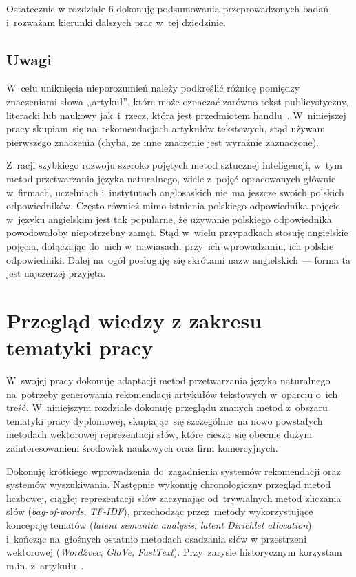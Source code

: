 \documentclass[pl]{minipw} %
\begin{document}
Ostatecznie w rozdziale 6 dokonuję podsumowania przeprowadzonych badań i~rozważam kierunki dalszych prac w~tej dziedzinie.

\section{Uwagi}
W~celu uniknięcia nieporozumień należy podkreślić różnicę pomiędzy znaczeniami słowa ,,artykuł'', które może oznaczać zarówno tekst publicystyczny, literacki lub naukowy jak~i~rzecz, która jest przedmiotem handlu~\cite{slownik}. W~niniejszej pracy skupiam~się na~rekomendacjach artykułów tekstowych, stąd używam pierwszego znaczenia (chyba, że inne znaczenie jest wyraźnie zaznaczone).

Z~racji szybkiego rozwoju szeroko pojętych metod sztucznej inteligencji, w~tym metod przetwarzania języka naturalnego, wiele z~pojęć opracowanych głównie w~firmach, uczelniach i~instytutach anglosaskich nie~ma jeszcze swoich polskich odpowiedników. Często również mimo istnienia polskiego odpowiednika pojęcie w~języku angielskim jest tak popularne, że używanie polskiego odpowiednika powodowałoby niepotrzebny zamęt. Stąd w~wielu przypadkach stosuję angielskie pojęcia, dołączając do~nich w~nawiasach, przy~ich wprowadzaniu, ich polskie odpowiedniki. Dalej na~ogół posługuję~się skrótami nazw angielskich --- forma ta jest najszerzej przyjęta. 

\chapter{Przegląd wiedzy z zakresu tematyki pracy}
W~swojej pracy dokonuję adaptacji metod przetwarzania języka naturalnego na~potrzeby generowania rekomendacji artykułów tekstowych w~oparciu o~ich treść. W~niniejszym rozdziale dokonuję przeglądu znanych metod z~obszaru tematyki pracy dyplomowej, skupiając~się szczególnie~na nowo powstałych metodach wektorowej reprezentacji słów, które cieszą~się obecnie dużym zainteresowaniem środowisk naukowych oraz firm komercyjnych. 

Dokonuję krótkiego wprowadzenia do~zagadnienia systemów rekomendacji oraz systemów wyszukiwania. Następnie wykonuję chronologiczny przegląd metod liczbowej, ciągłej reprezentacji słów zaczynając od~trywialnych metod zliczania słów (\textit{bag-of-words}, \textit{TF-IDF}), przechodząc przez~metody wykorzystujące koncepcję tematów (\textit{latent semantic analysis}, \textit{latent Dirichlet allocation}) i~kończąc na~głośnych ostatnio metodach osadzania słów w przestrzeni wektorowej (\textit{Word2vec}, \textit{GloVe}, \textit{FastText}). Przy~zarysie historycznym korzystam m.in. z~artykułu~\cite{aylien}.
\end{document}

